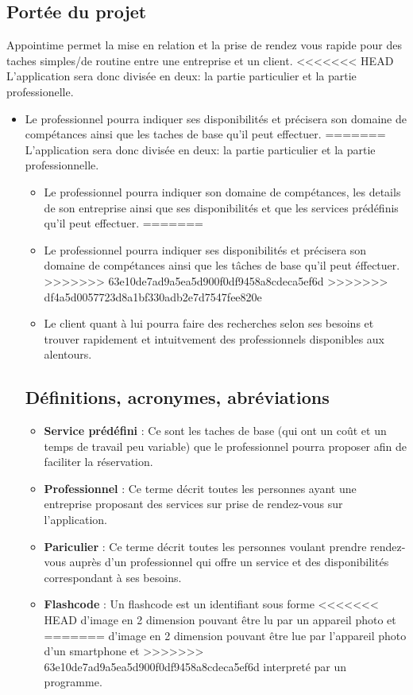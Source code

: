\documentclass{article}
\begin{document}
\subsection{Portée du projet}
Appointime permet la mise en relation et la prise de rendez vous rapide pour des taches simples/de routine entre une entreprise et un client.
<<<<<<< HEAD
L’application sera donc divisée en deux: la partie particulier et la partie professionelle.
\begin{itemize}
\item Le professionnel pourra indiquer ses disponibilités et précisera son domaine de compétances ainsi que les taches de base qu’il peut effectuer.
=======
L’application sera donc divisée en deux: la partie particulier et la partie professionnelle.
\begin{itemize}
<<<<<<< HEAD
\item Le professionnel pourra indiquer son domaine de compétances, les details de son entreprise ainsi que ses disponibilités
 et que les services prédéfinis qu’il peut effectuer.
=======
\item Le professionnel pourra indiquer ses disponibilités et précisera son domaine de compétances ainsi que les tâches de base qu’il peut éffectuer.
>>>>>>> 63e10de7ad9a5ea5d900f0df9458a8cdeca5ef6d
>>>>>>> df4a5d0057723d8a1bf330adb2e7d7547fee820e
\item Le client quant à lui pourra faire des recherches selon ses
  besoins et trouver rapidement et intuitvement des professionnels
  disponibles aux alentours.
\end{itemize}
\subsection{Définitions, acronymes, abréviations}
\begin{itemize}

\item \textbf{Service prédéfini} : Ce sont les taches de base 
(qui ont un coût et un temps de travail peu variable) que le professionnel pourra proposer afin de faciliter la réservation.
\item \textbf{Professionnel} : Ce terme décrit toutes les personnes ayant une entreprise proposant des
  services sur prise de rendez-vous sur l'application.
\item \textbf{Pariculier} : Ce terme décrit toutes les personnes
  voulant prendre rendez-vous auprès d'un professionnel qui offre un service et des disponibilités correspondant à ses besoins.
\item \textbf{Flashcode} : Un flashcode est un identifiant sous forme
<<<<<<< HEAD
  d'image en 2 dimension pouvant être lu par un appareil photo et
=======
  d'image en 2 dimension pouvant être lue par l'appareil photo d'un smartphone et
>>>>>>> 63e10de7ad9a5ea5d900f0df9458a8cdeca5ef6d
  interpreté par un programme.


\end{itemize}
\end{itemize}
\end{document}
